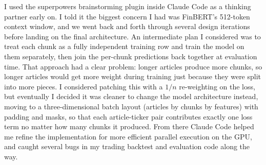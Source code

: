 \documentclass[11pt]{article}
\begin{document}
I used the superpowers brainstorming plugin inside Claude Code as a thinking partner early on. I told it the biggest concern I had was FinBERT's 512-token context window, and we went back and forth through several design iterations before landing on the final architecture. An intermediate plan I considered was to treat each chunk as a fully independent training row and train the model on them separately, then join the per-chunk predictions back together at evaluation time. That approach had a clear problem: longer articles produce more chunks, so longer articles would get more weight during training just because they were split into more pieces. I considered patching this with a $1/n$ re-weighting on the loss, but eventually I decided it was cleaner to change the model architecture instead, moving to a three-dimensional batch layout (articles by chunks by features) with padding and masks, so that each article-ticker pair contributes exactly one loss term no matter how many chunks it produced. From there Claude Code helped me refine the implementation for more efficient parallel execution on the GPU, and caught several bugs in my trading backtest and evaluation code along the way.
\end{document}
